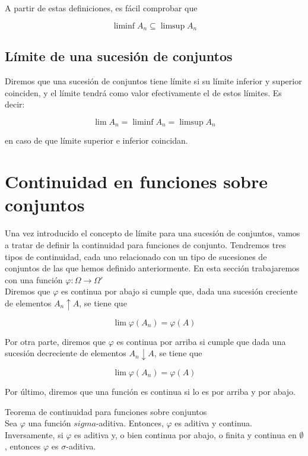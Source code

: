 \documentclass[12pt,a4paper]{book}
\begin{document}
A partir de estas definiciones, es fácil comprobar que 

$$ \liminf A_n \subseteq \limsup A_n $$

\subsection{Límite de una sucesión de conjuntos}

Diremos que una sucesión de conjuntos tiene límite si su límite inferior y superior coinciden, y el límite tendrá como valor efectivamente el de estos límites. Es decir: 

$$ \lim A_n = \liminf A_n = \limsup A_n $$ 

en caso de que límite superior e inferior coincidan.

\section{Continuidad en funciones sobre conjuntos}

Una vez introducido el concepto de límite para una sucesión de conjuntos, vamos a tratar de definir la continuidad para funciones de conjunto. Tendremos tres tipos de continuidad, cada uno relacionado con un tipo de sucesiones de conjuntos de las que hemos definido anteriormente. En esta sección trabajaremos con una función $\varphi : \Omega \to \Omega'$\\

Diremos que $\varphi$ es continua por abajo si cumple que, dada una sucesión creciente de elementos $A_n \uparrow A$, se tiene que 

$$ \lim \varphi (A_n) = \varphi (A) $$

Por otra parte, diremos que $\varphi$ es continua por arriba si cumple que dada una sucesión decreciente de elementos $A_n \downarrow A$, se tiene que 

$$ \lim \varphi (A_n) = \varphi (A)$$

Por último, diremos que una función es continua si lo es por arriba y por abajo.

\begin{theorem} 
Teorema de continuidad para funciones sobre conjuntos\\

Sea $\varphi$ una función $sigma$-aditiva. Entonces, $\varphi$ es aditiva y continua. Inversamente, si $\varphi$ es aditiva y, o bien continua por abajo, o finita y continua en $\emptyset$, entonces $\varphi$ es $\sigma$-aditiva.
\end{theorem}
\end{document}
